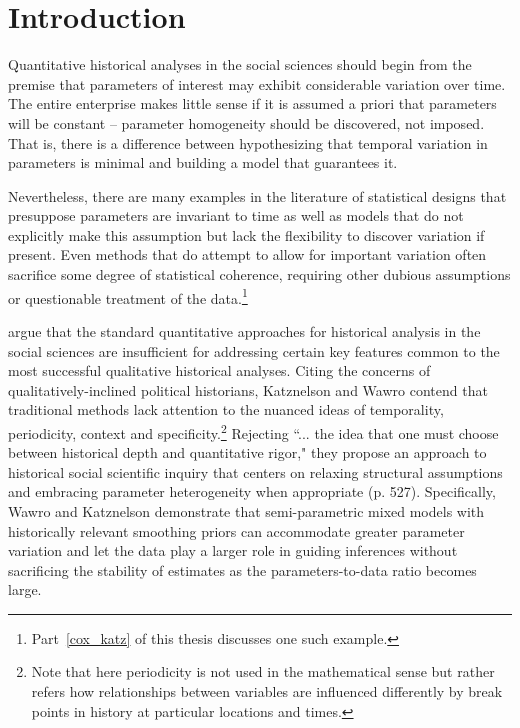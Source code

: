 \chapter{Introduction}
\label{introduction}

%


Quantitative historical analyses in the social sciences should begin from the premise that 
parameters of interest may exhibit considerable variation over time. The entire enterprise 
makes little sense if it is assumed a priori that parameters will be constant -- parameter 
homogeneity should be discovered, not imposed. That is, there is a difference between 
hypothesizing that temporal variation in parameters is minimal and building a model that 
guarantees it. 

Nevertheless, there are many examples in the literature of statistical designs 
that presuppose parameters are invariant to time as well as models that do not explicitly 
make this assumption but lack the flexibility to discover variation if present.  Even methods that 
do attempt to allow for important variation often sacrifice some degree of statistical 
coherence, requiring other dubious assumptions or questionable treatment of the data.\footnote{
Part~\ref{cox_katz} of this thesis discusses one such example.}

 argue that the standard quantitative approaches for historical 
analysis in the social sciences are insufficient for addressing certain key features common to 
the most successful qualitative historical analyses. Citing the concerns of qualitatively-inclined 
political historians, Katznelson and Wawro contend that traditional methods lack attention to 
the nuanced ideas of temporality, periodicity, context and specificity.\footnote{Note that here 
periodicity is not used in the mathematical sense but rather refers how relationships between 
variables are influenced differently by break points in history at particular locations and times.}  
Rejecting ``... the idea that one must choose between historical depth and quantitative rigor," 
they propose an approach to historical social scientific inquiry that centers on relaxing structural 
assumptions and embracing parameter heterogeneity when appropriate (p. 527). Specifically, 
Wawro and Katznelson demonstrate that semi-parametric mixed models with historically relevant 
smoothing priors can accommodate greater parameter variation and let the data play a larger role 
in guiding inferences without sacrificing the stability of estimates as the parameters-to-data ratio 
becomes large.  

